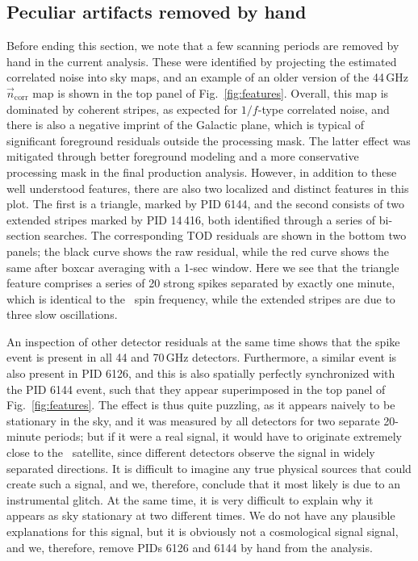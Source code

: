 \documentclass[twocolumn]{aa}
\newcommand{\n}[0]{\vec{n}}
\begin{document}
\subsection{Peculiar artifacts removed by hand}

Before ending this section, we note that a few scanning periods are
removed by hand in the current analysis. These were identified by
projecting the estimated correlated noise into sky maps, and an
example of an older version of the 44\,GHz $\n_{\mathrm{corr}}$ map is
shown in the top panel of Fig.~\ref{fig:features}. Overall, this map
is dominated by coherent stripes, as expected for $1/f$-type
correlated noise, and there is also a negative imprint of the Galactic
plane, which is typical of significant foreground residuals outside
the processing mask. The latter effect was mitigated through better
foreground modeling and a more conservative processing mask in the
final production analysis. However, in addition to these well
understood features, there are also two localized and distinct
features in this plot. The first is a triangle, marked by PID 6144,
and the second consists of two extended stripes marked by PID 14\,416,
both identified through a series of bi-section searches. The
corresponding TOD residuals are shown in the bottom two panels; the
black curve shows the raw residual, while the red curve shows the same
after boxcar averaging with a 1-sec window. Here we see that the
triangle feature comprises a series of 20 strong spikes separated by
exactly one minute, which is identical to the \Planck\ spin frequency,
while the extended stripes are due to three slow oscillations.

An inspection of other detector residuals at the same time shows that
the spike event is present in all 44 and 70\,GHz
detectors. Furthermore, a similar event is also present in PID 6126,
and this is also spatially perfectly synchronized with the PID 6144
event, such that they appear superimposed in the top panel of
Fig.~\ref{fig:features}. The effect is thus quite puzzling, as it
appears naively to be stationary in the sky, and it was measured by
all detectors for two separate 20-minute periods; but if it were a
real signal, it would have to originate extremely close to the
\Planck\ satellite, since different detectors observe the signal in
widely separated directions. It is difficult to imagine any true
physical sources that could create such a signal, and we, therefore,
conclude that it most likely is due to an instrumental glitch. At the
same time, it is very difficult to explain why it appears as sky
stationary at two different times. We do not have any plausible
explanations for this signal, but it is obviously not a cosmological
signal signal, and we, therefore, remove PIDs 6126 and 6144 by hand
from the analysis.
\end{document}
